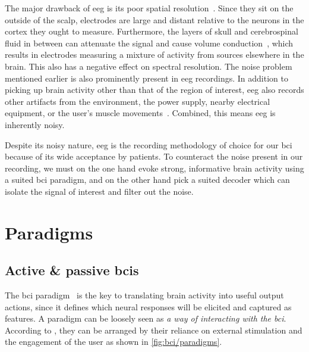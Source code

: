 The major drawback of \ac{eeg} is its poor spatial resolution~\cite{Ferree2001}.
Since they sit on the outside of the scalp, electrodes are large and distant relative to
the neurons in the cortex they ought to measure.
Furthermore, the layers of skull and cerebrospinal fluid in between can attenuate the
signal and cause volume conduction~\cite{Broek1998}, which results in electrodes
measuring a mixture of activity from sources elsewhere in the brain.
This also has a negative effect on spectral resolution.
The noise problem mentioned earlier is also prominently present in \ac{eeg} recordings.
In addition to picking up brain activity other than that of the region of interest,
\ac{eeg} also records other artifacts from the environment, the power supply, nearby
electrical equipment, or the user's muscle movements~\cite{Urigueen2015}.
Combined, this means \ac{eeg} is inherently noisy.

Despite its noisy nature, \ac{eeg} is the recording methodology of choice for our
\ac{bci} because of its wide acceptance by patients.
To counteract the noise present in our recording, we must on the one hand evoke strong,
informative brain activity using a suited \ac{bci} paradigm, and on the other hand pick
a suited decoder which can isolate the signal of interest and filter out the noise.


\section{Paradigms}
\label{sec:bci/paradigms}

\subsection{Active \& passive \acsp{bci}}

The \ac{bci} paradigm~\cite{Xu2021,Neeling2019} is the key to translating brain activity
into useful output actions, since it defines which neural responses will be elicited and
captured as features.
A paradigm can be loosely seen as \emph{a way of interacting with the \ac{bci}}.
According to \textcite{Zander2011}, they can be arranged by their reliance on external
stimulation and the engagement of the user as shown in \autoref{fig:bci/paradigms}.


